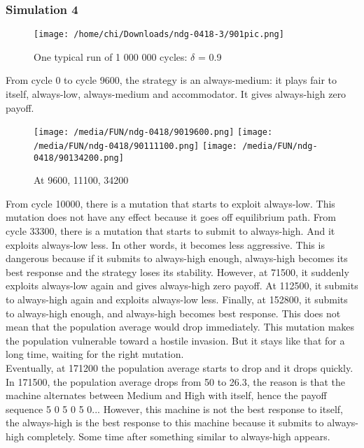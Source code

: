 \documentclass[12.5pt]{report}
\begin{document}
\subsubsection{Simulation 4}

\begin{figure}[h!]
\center
\texttt{[image: /home/chi/Downloads/ndg-0418-3/901pic.png]}
\caption{One typical run of 1 000 000 cycles: $\delta$ = 0.9}
\end{figure}

From cycle 0 to cycle 9600, the strategy is an always-medium: it plays fair to itself, always-low, always-medium and accommodator. It gives always-high zero payoff.
\begin{figure}[h!]
\center
\texttt{[image: /media/FUN/ndg-0418/9019600.png]}
\texttt{[image: /media/FUN/ndg-0418/90111100.png]}
\texttt{[image: /media/FUN/ndg-0418/90134200.png]}

\caption{At 9600, 11100, 34200}
\end{figure}
From cycle 10000, there is a mutation that starts to exploit always-low. This mutation does not have any effect because it goes off equilibrium path. From cycle 33300, there is a mutation that starts to submit to always-high. And it exploits always-low less. In other words, it becomes less aggressive. This is dangerous because if it submits to always-high enough, always-high becomes its best response and the strategy loses its stability. However, at 71500, it suddenly exploits always-low again and gives always-high zero payoff. At 112500, it submits to always-high again and exploits always-low less. Finally, at 152800, it submits to always-high enough, and always-high becomes best response. This does not mean that the population average would drop immediately. This mutation makes the population vulnerable toward a hostile invasion. But it stays like that for a long time, waiting for the right mutation. \\

Eventually, at 171200 the population average starts to drop and it drops quickly. In 171500, the population average drops from 50 to 26.3, the reason is that the machine alternates between Medium and High with itself, hence the payoff sequence 5 0 5 0 5 0... However, this machine is not the best response to itself, the always-high is the best response to this machine because it submits to always-high completely. Some time after something similar to always-high appears.\\
\end{document}
